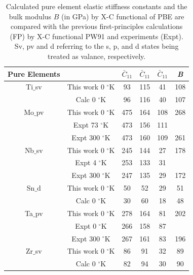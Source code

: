 \newpage
\begin{table}[H]
	\caption{Calculated pure element elastic stiffness constants and the bulk modulus $B$ (in GPa) by X-C functional of PBE are compared with the previous first-principles calculations (FP) by X-C functional PW91 and experiments (Expt). Sv, pv and d referring to the s, p, and d states being treated as valance, respectively.}
	\centering
	\begin{tabular}{ c c c c c c }
		\hline
		Pure Elements & & $\bar{C}_{11}$ & $\bar{C}_{11}$  & $\bar{C}_{11}$ & \textit{B}\\
		\hline
		Ti$\_$sv & This work 0 $^\circ$K & 93 & 115 & 41 & 108\\
		& Calc 0 $^\circ$K \cite{Shang2010b} & 96 & 116 & 40 & 107\\
		Mo$\_$pv & This work 0 $^\circ$K & 475 & 164 & 108 & 268\\
		& Expt 73 $^\circ$K \cite{Simmons1971b} & 473 & 156 & 111 &\\
		& Expt 300 $^\circ$K \cite{Dickinson1967a} & 473 & 160 & 109 & 261\\
		Nb$\_$sv & This work 0 $^\circ$K & 245 & 144 & 27 & 178\\
		& Expt 4 $^\circ$K \cite{Simmons1971b} & 253 & 133 & 31 & \\
		& Expt 300 $^\circ$K \cite{Bolef1961} & 247 & 135 & 29 & 172\\
		Sn$\_$d & This work 0 $^\circ$K & 50 & 52 & 29 & 51\\
		& Calc 0 $^\circ$K \cite{Shang2010b} & 30 & 60 & 18 & 48\\
		Ta$\_$pv & This work 0 $^\circ$K & 278 & 164 & 81 & 202\\
		& Expt 0 $^\circ$K \cite{Simmons1971b} & 266 & 158 & 87 & \\
		& Expt 300 $^\circ$K \cite{Bolef1961} & 267 & 161 & 83 & 196\\
		Zr$\_$sv & This work 0 $^\circ$K & 86 & 91 & 32 & 89\\
		& Calc 0 $^\circ$K \cite{Shang2010b} & 82 & 94 & 30 & 90\\
		\hline
	\end{tabular}
	\label{Ch5-table:pureeleelas}
\end{table}
\clearpage

